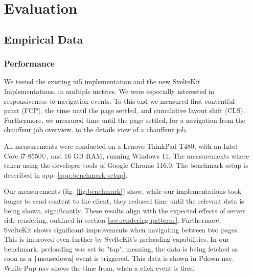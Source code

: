 \chapter{Evaluation}
\label{ch:evaluation}

\section{Empirical Data}

\subsection{Performance}

We tested the existing ui5 implementation and the new SvelteKit Implementations, in multiple metrics. We were especially interested in responsiveness to navigation events. To this end we measured first contentful paint (FCP), the time until the page settled, and cumulative layout shift (CLS). Furthermore, we measured time until the page settled, for a navigation from the chauffeur job overview, to the details view of a chauffeur job.

All measurements were conducted on a Lenovo ThinkPad T480, with an Intel Core i7-8550U, and 16 GB RAM, running Windows 11. The measurements where taken using the developer tools of Google Chrome 116.0. The benchmark setup is described in app. \ref{app:benchmark-setup}.

Our measurements (fig. \ref{fig:benchmark}) show, while our implementations took longer to send content to the client, they reduced time until the relevant data is being shown, significantly. These results align with the expected effects of server side rendering, outlined in section \ref{sec:rendering-patterns}. Furthermore, SvelteKit shows significant improvements when navigating between two pages. This is improved even further by SvelteKit's preloading capabilities. In our benchmark, preloading was set to "tap", meaning, the data is being fetched as soon as a \texttt|mousedown| event is triggered. This data is shown in Pdown nav. While Pup nav shows the time from, when a click event is fired.  

